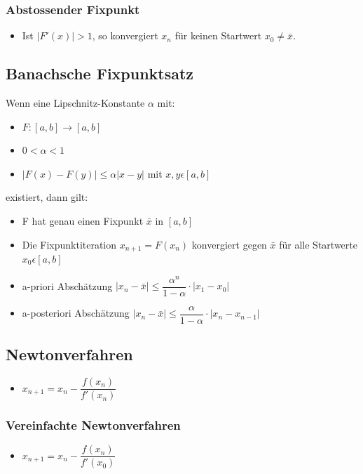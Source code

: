 \documentclass[6pt,a4paper]{scrartcl}
\begin{document}
\begin{multicols*}{4}
			\subsubsection{Abstossender Fixpunkt}
			\begin{itemize}\itemsep0pt	
					\item Ist $|F'(x)| > 1$, so konvergiert $x_{n}$ für keinen Startwert $x_{0}\neq \bar{x}$.
			\end{itemize}

		\subsection{Banachsche Fixpunktsatz}
			Wenn eine Lipschnitz-Konstante $\alpha$ mit:
			
			\begin{itemize}\itemsep0pt	
				\item $F: [a,b] \rightarrow [a,b]$
				\item $0<\alpha <1$
				\item $|F(x) - F(y)| \leq \alpha |x-y|$ mit $x,y \epsilon [a,b]$
			\end{itemize}
			
			 existiert, dann gilt:
			 
			 \begin{itemize}\itemsep0pt	
				\item F hat genau einen Fixpunkt $\bar{x}$ in $[a,b]$
				\item Die Fixpunktiteration $x_{n+1} = F(x_{n})$ konvergiert gegen $\bar{x}$ für alle Startwerte $x_{0} \epsilon [a,b]$
				\item a-priori Abschätzung $|x_{n} - \bar{x}| \leq \dfrac{\alpha^{n}}{1-\alpha}\cdot |x_{1}-x_{0}|$ 
				
				\item a-posteriori Abschätzung $|x_{n} - \bar{x}| \leq \dfrac{\alpha}{1-\alpha}\cdot |x_{n}-x_{n-1}|$ 
			\end{itemize}
			 
			 
		\subsection{Newtonverfahren}
			\begin{itemize}\itemsep0pt	
				\item $x_{n+1} = x_{n} - \dfrac{f(x_{n})}{f'(x_{n})}$
			\end{itemize}
			\subsubsection{Vereinfachte Newtonverfahren}
				\begin{itemize}\itemsep0pt	
					\item $x_{n+1} = x_{n} - \dfrac{f(x_{n})}{f'(x_{0})}$
				\end{itemize}

\end{multicols*}
\end{document}

